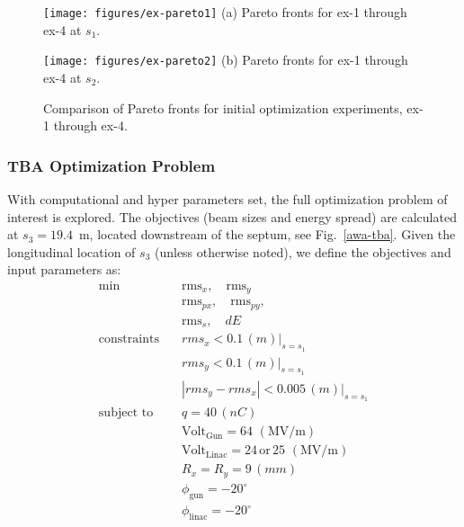 \begin{figure}
	\centering
	\begin{minipage}{0.49\textwidth}
		\centering
		\texttt{[image: figures/ex-pareto1]}
		(a) Pareto fronts for ex-1 through ex-4 at $s_1$.
		\vspace{2em}
	\end{minipage}
	\begin{minipage}{0.49\textwidth}
		\centering
		\texttt{[image: figures/ex-pareto2]}
		(b) Pareto fronts for ex-1 through ex-4 at $s_2$.
	\end{minipage}
	\caption{Comparison of Pareto fronts for initial optimization experiments, ex-1 through ex-4.}
	\label{expareto}
\end{figure}



\subsubsection{TBA Optimization Problem}
With computational and hyper parameters set, 
the full optimization problem of interest is explored.
The objectives (beam sizes and energy spread) are calculated at 
$s_3=19.4$~m, located downstream of the septum, see Fig.~\ref{awa-tba}. 
Given the longitudinal location of $s_3$ (unless otherwise noted), 
we define the objectives and input parameters as:
\begin{align}
\text{min}  \quad & \text{rms}_{x}, \quad \text{rms}_{y} \label{eq:awa:p1}\\
& \text{rms}_{px}, \quad \text{rms}_{py}, \label{eq:awa:p2}\\
& \text{rms}_{s}, \quad dE \label{eq:awa:p4} \\
\text{constraints} \quad & rms_x < 0.1 \, (m) |_{s=s_1}\label{eq:awa:c1}\\
\quad & rms_y < 0.1\, (m) |_{s=s_1}\, \label{eq:awa:c2}\\
\quad & |rms_y - rms_x | < 0.005 \, (m) |_{s=s_1}\label{eq:awa:c3}\\
\text{subject to} \quad & q = 40 \, (nC) \label{eq:awa:firstconstr}\\
\quad & \text{Volt}_{\text{Gun}} = 64 \, \, (\text{MV/m}) \label{eq:awa:lastconstr}\\
\quad & \text{Volt}_{\text{Linac}} = 24 \, \text{or} \, 25\,\, (\text{MV/m}) \\
\quad & R_x = R_y = 9 \, (mm) \label{eq:awa:firstdvar}\\
\quad & \phi_{\text{gun}} =-20^\circ \label{eq:awa:gphidvar}\\
\quad & \phi_{\text{linac}} =-20^\circ \label{eq:awa:lastdvar}
\end{align}



